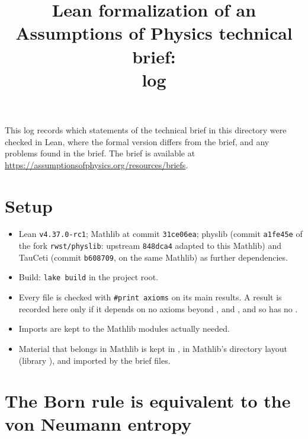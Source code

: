 \documentclass[11pt]{article}
\title{Lean formalization of an Assumptions of Physics technical brief:\\ log}
\author{}
\date{}
\begin{document}
\maketitle

\noindent
This log records which statements of the technical brief in this directory were checked in Lean,
where the formal version differs from the brief, and any problems found in the brief.
The brief is available at \url{https://assumptionsofphysics.org/resources/briefs}.

\section*{Setup}

\begin{itemize}
\item Lean \texttt{v4.37.0-rc1}; Mathlib at commit \texttt{31ce06ea}; physlib (commit \texttt{a1fe45e}
  of the fork \texttt{rwst/physlib}: upstream \texttt{848dca4} adapted to this Mathlib) and
  TauCeti (commit \texttt{b608709}, on the same Mathlib) as further dependencies.
\item Build: \texttt{lake build} in the project root.
\item Every file is checked with \texttt{\#print axioms} on its main results. A result is
  recorded here only if it depends on no axioms beyond ,
   and , and so has no .
\item Imports are kept to the Mathlib modules actually needed.
\item Material that belongs in Mathlib is kept in , in Mathlib's directory
  layout (library ), and imported by the brief files.
\end{itemize}



\section{The Born rule is equivalent to the von Neumann entropy}
\end{document}
